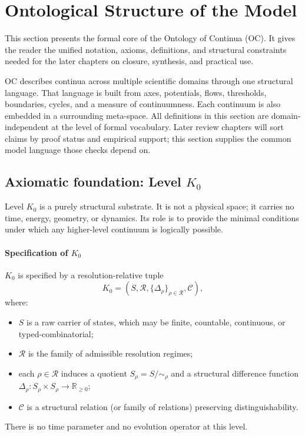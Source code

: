 
\section{Ontological Structure of the Model}
\label{sec:model}

This section presents the formal core of the Ontology of Continua (OC).
It gives the reader the unified notation, axioms, definitions, and structural
constraints needed for the later chapters on closure, synthesis, and practical
use.

OC describes continua across multiple scientific domains through one structural
language. That language is built from axes, potentials, flows, thresholds,
boundaries, cycles, and a measure of continuumness. Each continuum is also
embedded in a surrounding meta-space. All definitions in this section are
domain-independent at the level of formal vocabulary. Later review chapters
will sort claims by proof status and empirical support; this section supplies
the common model language those checks depend on.

\subsection{Axiomatic foundation: Level \texorpdfstring{$K_0$}{K\_0}}

Level \(K_0\) is a purely structural substrate.
It is not a physical space; it carries no time, energy, geometry, or dynamics.
Its role is to provide the minimal conditions under which any higher-level continuum is logically possible.

\paragraph{Specification of \texorpdfstring{\(K_0\)}{K\_0}}
\(K_0\) is specified by a resolution-relative tuple
\[
    K_0 = (S,\mathcal{R},\{\Delta_\rho\}_{\rho\in\mathcal{R}},\mathcal{C}),
\]
where:
\begin{itemize}
    \item \(S\) is a raw carrier of states, which may be finite, countable, continuous, or typed-combinatorial;
    \item \(\mathcal{R}\) is the family of admissible resolution regimes;
    \item each \(\rho\in\mathcal{R}\) induces a quotient \(S_\rho=S/{\sim_\rho}\) and a structural difference function \(\Delta_\rho:S_\rho\times S_\rho\to\mathbb{R}_{\ge 0}\);
    \item \(\mathcal{C}\) is a structural relation (or family of relations) preserving distinguishability.
\end{itemize}
There is no time parameter and no evolution operator at this level.

